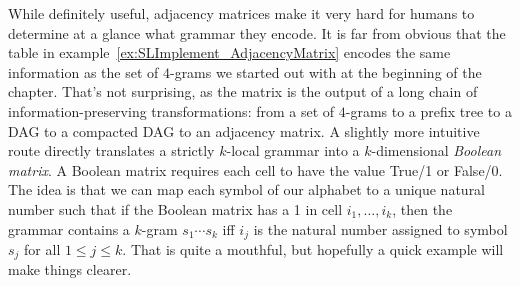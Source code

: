 While definitely useful, adjacency matrices make it very hard for humans to determine at a glance what grammar they encode.
It is far from obvious that the table in example~\ref{ex:SLImplement_AdjacencyMatrix} encodes the same information as the set of $4$-grams we started out with at the beginning of the chapter.
That's not surprising, as the matrix is the output of a long chain of information-preserving transformations: from a set of $4$-grams to a prefix tree to a DAG to a compacted DAG to an adjacency matrix.
%
%
A slightly more intuitive route directly translates a strictly $k$-local grammar into a $k$-dimensional \emph{Boolean matrix}.
A Boolean matrix requires each cell to have the value True\slash 1 or False\slash 0.
The idea is that we can map each symbol of our alphabet to a unique natural number such that if the Boolean matrix has a 1 in cell $i_1, \ldots, i_k$, then the grammar contains a $k$-gram $s_1 \cdots s_k$ iff $i_j$ is the natural number assigned to symbol $s_j$ for all $1 \leq j \leq k$.
That is quite a mouthful, but hopefully a quick example will make things clearer.
%
